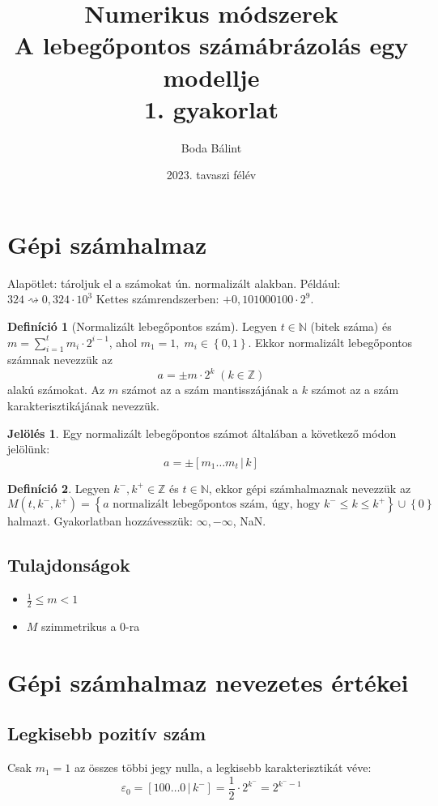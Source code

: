 \documentclass[a4paper,12pt]{article}
\title{\huge{Numerikus módszerek \\[-4pt] A lebegőpontos számábrázolás egy modellje} \\ \large 1. gyakorlat \vspace{-15pt}}
\author{Boda Bálint}
\date{\vspace{-12pt}2023. tavaszi félév}
\theoremstyle{definition}
\newtheorem*{definition*}{Definíció}
\newtheorem*{notation*}{Jelölés}
\begin{document}
	\maketitle
	\section{Gépi számhalmaz}
	\vspace{-10pt}
		Alapötlet: tároljuk el a számokat ún. normalizált alakban. Például: $ 324 \rightsquigarrow 0,324 \cdot 10^3 $ Kettes számrendszerben: $ +0,101000100 \cdot 2^9 $.
	\begin{definition*}[Normalizált lebegőpontos szám]
		Legyen $ t \in \mathbb{N} $ (bitek száma) és $ m = \sum\limits_{i=1}^{t}{m_i \cdot 2^{i-1}} $, ahol $ m_1 = 1, \; m_i \in \left\lbrace 0, 1 \right\rbrace $. Ekkor normalizált lebegőpontos számnak nevezzük az
		\[
		a = \pm m \cdot 2^k \; (k \in \mathbb{Z})
		\]
		alakú számokat. Az $m$ számot az a szám mantisszájának a $k$ számot az a szám karakterisztikájának nevezzük.
	\end{definition*}

	\begin{notation*}
		Egy normalizált lebegőpontos számot általában a következő módon jelölünk:
		\[ a=\pm \left[ m_1 \dots m_t \, | \, k \right] \]
	\end{notation*}

	\begin{definition*}
		Legyen $ k^-, k^+ \in \mathbb{Z} $ és $ t \in \mathbb{N} $, ekkor gépi számhalmaznak nevezzük az
		\[
		M(t, k^-, k^+) = \left\lbrace a \text{ normalizált lebegőpontos szám, úgy, hogy } k^- \le k \le k^+ \right\rbrace \cup \left\lbrace 0 \right\rbrace 
		\]
		halmazt. Gyakorlatban hozzávesszük: $ \infty, -\infty $, NaN.
	\end{definition*}
	\subsection{Tulajdonságok}
	\begin{itemize}
		\item $ \frac{1}{2} \le m < 1 $
		\item $M$ szimmetrikus a $0$-ra
	\end{itemize}
	
	\section{Gépi számhalmaz nevezetes értékei}
	\subsection{Legkisebb pozitív szám}
	Csak $m_1 = 1$ az összes többi jegy nulla, a legkisebb karakterisztikát véve:
	\[
	\varepsilon_0 = \left[100 \dots 0 \, | \, k^-\right] = \frac{1}{2} \cdot 2^{k^-} = 2^{k^{-}-1}
	\]
	
\end{document}
